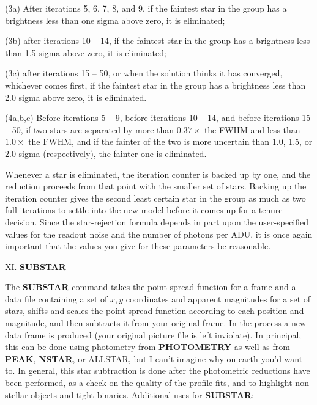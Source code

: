 \item{(3a)} After iterations 5, 6, 7, 8, and 9, if the faintest star in
the group has a brightness less than one sigma above zero, it is
eliminated; 

\item{(3b)} after iterations 10 -- 14, if the faintest star in the
group has a brightness less than 1.5 sigma above zero, it is
eliminated;

\item{(3c)} after iterations 15 -- 50, or when the solution thinks it
has converged, whichever comes first, if the faintest star in the group
has a brightness less than 2.0 sigma above zero, it is eliminated.

\item{(4a,b,c)}  Before iterations 5 -- 9, before iterations 10 -- 14,
and before iterations 15 -- 50, if two stars are separated by more than
$0.37 \times$  the FWHM and less than $1.0 \times$  the FWHM, and if
the fainter of the two is more uncertain than 1.0, 1.5, or 2.0 sigma
(respectively), the fainter one is eliminated.

\noindent Whenever a star is eliminated, the iteration counter is
backed up by one, and the reduction proceeds from that point with the
smaller set of stars. Backing up the iteration counter gives the second
least certain star in the group as much as two full iterations to
settle into the new model before it comes up for a tenure decision.
Since the star-rejection formula depends in part upon the
user-specified values for the readout noise and the number of photons
per ADU, it is once again important that the values you give for these
parameters be reasonable.

\vfill
\eject
\noindent XI.  {\bf SUBSTAR}

The {\bf SUBSTAR} command takes the point-spread function for a frame
and a data file containing a set of $x,y$ coordinates and apparent
magnitudes for a set of stars, shifts and scales the point-spread
function according to each position and magnitude, and then subtracts
it from your original frame.  In the process a new data frame is
produced (your original picture file is left inviolate). In principal,
this can be done using photometry from {\bf PHOTOMETRY} as well as from
{\bf PEAK}, {\bf NSTAR}, or ALLSTAR, but I can't imagine why on
earth you'd want to.  In general, this star subtraction is done after
the photometric reductions have been performed, as a check on the
quality of the profile fits, and to highlight non-stellar objects and
tight binaries.  Additional uses for {\bf SUBSTAR}:

